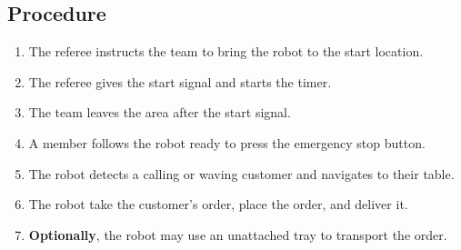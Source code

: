 \subsection*{Procedure}

\begin{enumerate}
	\item The referee instructs the team to bring the robot to the start location.
	\item The referee gives the start signal and starts the timer.
	\item The team leaves the area after the start signal.
	\item A \TC{} member follows the robot ready to press the emergency stop button. 
	\item The robot detects a calling or waving customer and navigates to their table.
	\item The robot take the customer's order, place the order, and deliver it.
	\item \textbf{Optionally}, the robot may use an unattached tray to transport the order.
\end{enumerate}


